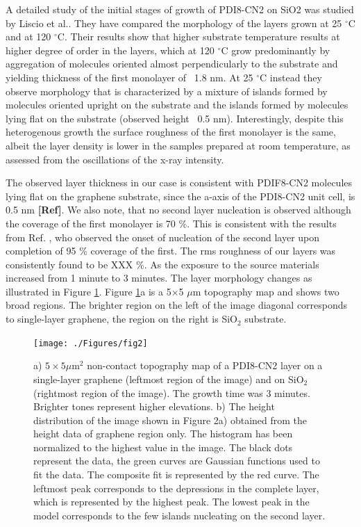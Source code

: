 \documentclass[preprint,aip,jap]{revtex4-2}
\begin{document}
 
A detailed study of the initial stages of growth of PDI8-CN2 on SiO2 was studied by Liscio et al.\cite{liscio-2013}. They have compared the morphology of the layers grown at 25 $^\circ$C and at 120 $^\circ$C. Their results show that higher substrate temperature results at higher degree of order in the layers, which at 120 $^\circ$C grow predominantly by aggregation of molecules oriented almost perpendicularly to the substrate and yielding thickness of the first monolayer of ~1.8 nm. At 25 $^\circ$C instead they observe morphology that is characterized by a mixture of islands formed by molecules oriented upright on the substrate and the islands formed by molecules lying flat on the substrate (observed height ~0.5 nm). Interestingly, despite this heterogenous growth the surface roughness of the first monolayer is the same, albeit the layer density is lower in the samples prepared at room temperature, as assessed from the oscillations of the x-ray intensity. 


The observed layer thickness in our case is consistent with PDIF8-CN2 molecules lying flat on the graphene substrate, since the a-axis of the PDI8-CN2 unit cell, is 0.5 nm \textbf{[Ref]}. We also note, that no second layer nucleation is observed although the coverage of the first monolayer is 70 \%. This is consistent with the results from Ref. , who observed the onset of nucleation of the second layer upon completion of 95 \% coverage of the first. The rms roughness of our layers was consistently found to be XXX \%. As the exposure to the source materials increased from 1 minute to 3 minutes. The layer morphology changes as illustrated in Figure \ref{fig:2}. Figure \ref{fig:2}a is a  5$\times$5 $\mu$m topography map and shows two broad regions. The brighter region on the left of the image diagonal corresponds to single-layer graphene, the region on the right is SiO$_{2}$ substrate. 
\begin{figure}[htb]
  \centering
   \texttt{[image: ./Figures/fig2]}
  \caption{a) $5\times5 \mu$m$^{2}$ non-contact topography map of a PDI8-CN2 layer on a single-layer graphene (leftmost region of the image) and on SiO$_{2}$ (rightmost region of the image). The growth time was 3 minutes. Brighter tones represent higher elevations. b) The height distribution of the image shown in Figure 2a) obtained from the height data of graphene region only. The histogram has been normalized to the highest value in the image. The black dots represent the data, the green curves are Gaussian functions used to fit the data. The composite fit is represented by the red curve.  The leftmost peak corresponds to the depressions in the complete layer, which is represented by the highest peak. The lowest peak in the model corresponds to the few islands nucleating on the second layer.}
  \label{fig:2}
\end{figure}
\end{document}
